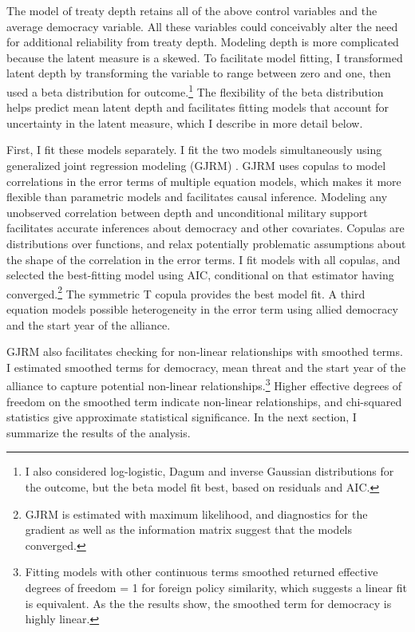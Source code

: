 \documentclass[12pt]{article}
\begin{document}
The model of treaty depth retains all of the above control variables and the average democracy variable. 
All these variables could conceivably alter the need for additional reliability from treaty depth. 
Modeling depth is more complicated because the latent measure is a skewed.
To facilitate model fitting, I transformed latent depth by transforming the variable to range between zero and one, then used a beta distribution for outcome.\footnote{I also considered log-logistic, Dagum and inverse Gaussian distributions for the outcome, but the beta model fit best, based on residuals and AIC.}
The flexibility of the beta distribution helps predict mean latent depth and facilitates fitting models that account for uncertainty in the latent measure, which I describe in more detail below. 


First, I fit these models separately. 
I fit the two models simultaneously using generalized joint regression modeling (GJRM) \citep{Braumoelleretal2018}.
GJRM uses copulas to model correlations in the error terms of multiple equation models, which makes it more flexible than parametric models and facilitates causal inference. 
Modeling any unobserved correlation between depth and unconditional military support facilitates accurate inferences about democracy and other covariates. 
Copulas are distributions over functions, and relax potentially problematic assumptions about the shape of the correlation in the error terms. 
I fit models with all copulas, and selected the best-fitting model using AIC, conditional on that estimator having converged.\footnote{GJRM is estimated with maximum likelihood, and diagnostics for the gradient as well as the information matrix suggest that the models converged.} 
The symmetric T copula provides the best model fit.
A third equation models possible heterogeneity in the error term using allied democracy and the start year of the alliance. 


GJRM also facilitates checking for non-linear relationships with smoothed terms. 
I estimated smoothed terms for democracy, mean threat and the start year of the alliance to capture potential non-linear relationships.\footnote{Fitting models with other continuous terms smoothed returned effective degrees of freedom = 1 for foreign policy similarity, which suggests a linear fit is equivalent. As the the results show, the smoothed term for democracy is highly linear.}  
Higher effective degrees of freedom on the smoothed term indicate non-linear relationships, and chi-squared statistics give approximate statistical significance. 
In the next section, I summarize the results of the analysis. 
\end{document}
